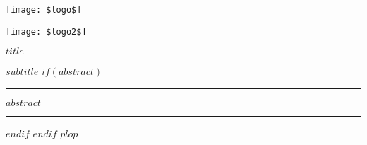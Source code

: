 \begin{titlepage}
\begin{minipage}{\linewidth}
  \texttt{[image: \$logo\$]}

  \texttt{[image: \$logo2\$]}

\end{minipage}

\vspace{2cm}

\LARGE\textbf{$title$}


\large\textbf{$subtitle$}
$if(abstract)$

\vspace{2cm}

\begin{center}

\end{center}
\par\rule{\textwidth}{0.5pt}

$abstract$

\par\rule{\textwidth}{0.5pt}


$endif$
$endif$
$plop$
\end{titlepage}
